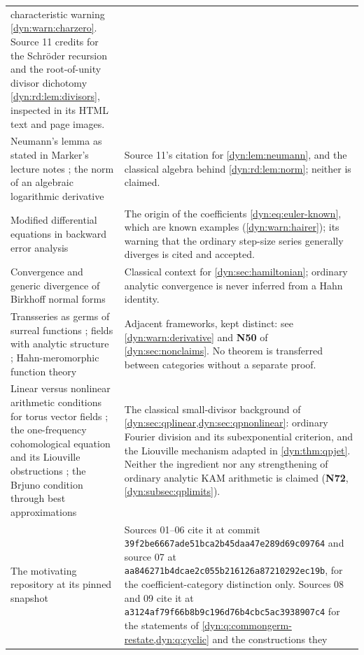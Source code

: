 \documentclass[11pt,letterpaper]{article}
\theoremstyle{definition}
\theoremstyle{remark}
\numberwithin{equation}{section}
\begin{document}
\begin{longtable}{@{}P{0.30\textwidth}P{0.62\textwidth}@{}}
characteristic warning \cref{dyn:warn:charzero}. Source 11 credits
\cite[Thm.~1.1 and Lemma~3.3]{Lindahl} for the Schr\"oder recursion and the
root-of-unity divisor dichotomy \cref{dyn:rd:lem:divisors}, inspected in its
HTML text and page images.\\[3pt]
Neumann's lemma as stated in Marker's lecture notes
\cite[Lemma~2.36]{Marker}; the norm of an algebraic logarithmic derivative
& Source 11's citation for \cref{dyn:lem:neumann}, and the classical
algebra behind \cref{dyn:rd:lem:norm}; neither is claimed.\\[3pt]
Modified differential equations in backward error analysis
\cite{Hairer}
& The origin of the coefficients \eqref{dyn:eq:euler-known}, which are
known examples (\cref{dyn:warn:hairer}); its warning that the ordinary
step-size series generally diverges is cited and accepted.\\[3pt]
Convergence and generic divergence of Birkhoff normal forms
\cite{PerezMarco,Krikorian}
& Classical context for \cref{dyn:sec:hamiltonian}; ordinary analytic
convergence is never inferred from a Hahn identity.\\[3pt]
Transseries as germs of surreal functions \cite{BM}; fields with analytic
structure \cite{CL}; Hahn-meromorphic function theory
\cite{MuellerStrohmaier}
& Adjacent frameworks, kept distinct: see
\cref{dyn:warn:derivative} and \textbf{N50} of
\cref{dyn:sec:nonclaims}. No theorem is transferred between categories
without a separate proof.\\[3pt]
Linear versus nonlinear arithmetic conditions for torus vector fields
\cite{Bounemoura}; the one-frequency cohomological equation and its
Liouville obstructions \cite{Kamienski}; the Brjuno condition through best
approximations \cite{Chevallier}
& The classical small-divisor background of
\cref{dyn:sec:qplinear,dyn:sec:qpnonlinear}: ordinary Fourier division and
its subexponential criterion, and the Liouville mechanism adapted in
\cref{dyn:thm:qpjet}. Neither the ingredient nor any strengthening of
ordinary analytic KAM arithmetic is claimed
(\textbf{N72}, \cref{dyn:subsec:qplimits}).\\[3pt]
The motivating repository at its pinned snapshot \cite{Repo}
& Sources 01--06 cite it at commit
\texttt{39f2be6667ade51bca2b45daa47e289d69c09764} and source 07 at
\texttt{aa846271b4dcae2c055b216126a87210292ec19b}, for the
coefficient-category distinction only. Sources 08 and 09 cite it at
\texttt{a3124af79f66b8b9c196d76b4cbc5ac3938907c4} for the statements of
\cref{dyn:q:commongerm-restate,dyn:q:cyclic} and the constructions they

\end{longtable}
\end{document}

